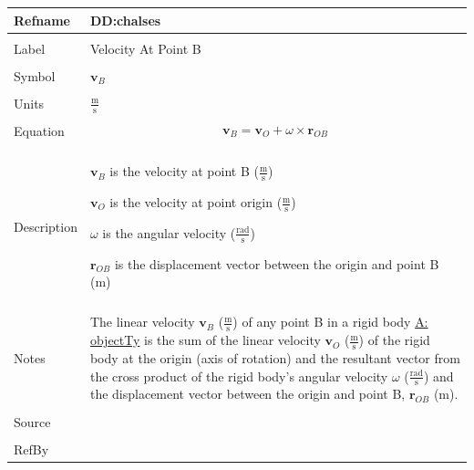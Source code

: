 \documentclass[12pt]{article}
\begin{document}
\noindent \begin{minipage}{\textwidth}
\begin{tabular}{p{} p{}}
\toprule \textbf{Refname} & \textbf{DD:chalses}
\label{DD:chalses}
\\ \midrule \\
Label & Velocity At Point B
        \\ \midrule \\
        Symbol & ${\mathbf{v}_{B}}$
                 \\ \midrule \\
                 Units & $\frac{\text{m}}{\text{s}}$
                         \\ \midrule \\
                         Equation & \begin{displaymath}
                                    {\mathbf{v}_{B}}={\mathbf{v}_{O}}+ω\times{\mathbf{r}_{OB}}
                                    \end{displaymath}
                                    \\ \midrule \\
                                    Description & \begin{symbDescription}
                                                  \item{${\mathbf{v}_{B}}$ is the velocity at point B ($\frac{\text{m}}{\text{s}}$)}
                                                  \item{${\mathbf{v}_{O}}$ is the velocity at point origin ($\frac{\text{m}}{\text{s}}$)}
                                                  \item{$ω$ is the angular velocity ($\frac{\text{rad}}{\text{s}}$)}
                                                  \item{${\mathbf{r}_{OB}}$ is the displacement vector between the origin and point B (m)}
                                                  \end{symbDescription}
                                                  \\ \midrule \\
                                                  Notes & The linear velocity ${\mathbf{v}_{B}}$ ($\frac{\text{m}}{\text{s}}$) of any point B in a rigid body \hyperref[A:objectTy]{A: objectTy} is the sum of the linear velocity ${\mathbf{v}_{O}}$ ($\frac{\text{m}}{\text{s}}$) of the rigid body at the origin (axis of rotation) and the resultant vector from the cross product of the rigid body's angular velocity $ω$ ($\frac{\text{rad}}{\text{s}}$) and the displacement vector between the origin and point B, ${\mathbf{r}_{OB}}$ (m).
                                                          \\ \midrule \\
                                                          Source & \\ \midrule \\
                                                                   RefBy & 
\\ \bottomrule \end{tabular}
\end{minipage}
\end{document}

